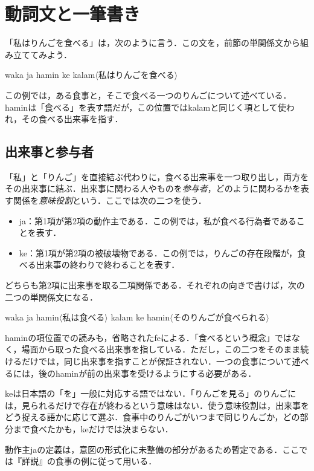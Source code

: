 \documentclass[b5paper, 10pt]{ltjsarticle}
\newcommand{\ko}[1]{\textsf{#1}}
\newcommand{\sentence}[1]{$\langle$#1$\rangle$}
\begin{document}
\section{動詞文と一筆書き}
「私はりんごを食べる」は，次のように言う．この文を，前節の単関係文から組み立ててみよう．
\begin{exe}
    \ex \ko{waka ja hamin ke kalam}\hfill \sentence{私はりんごを食べる}
\end{exe}
この例では，ある食事と，そこで食べる一つのりんごについて述べている．\ko{hamin}は「食べる」を表す語だが，この位置では\ko{kalam}と同じく項として使われ，その食べる出来事を指す．

\subsection{出来事と参与者}
「私」と「りんご」を直接結ぶ代わりに，食べる出来事を一つ取り出し，両方をその出来事に結ぶ．出来事に関わる人やものを\emph{参与者}，どのように関わるかを表す関係を\emph{意味役割}という．ここでは次の二つを使う．
\begin{itemize}
    \item \ko{ja}：第1項が第2項の動作主である．この例では，私が食べる行為者であることを表す．
    \item \ko{ke}：第1項が第2項の被破壊物である．この例では，りんごの存在段階が，食べる出来事の終わりで終わることを表す．
\end{itemize}
どちらも第2項に出来事を取る二項関係である．それぞれの向きで書けば，次の二つの単関係文になる．
\begin{exe}
    \ex \ko{waka ja hamin}\hfill \sentence{私は食べる}
    \ex \ko{kalam ke hamin}\hfill \sentence{そのりんごが食べられる}
\end{exe}
\ko{hamin}の項位置での読みも，省略された\ko{fe}による．「食べるという概念」ではなく，場面から取った食べる出来事を指している．ただし，この二つをそのまま続けるだけでは，同じ出来事を指すことが保証されない．一つの食事について述べるには，後の\ko{hamin}が前の出来事を受けるようにする必要がある．

\begin{remark}
    \ko{ke}は日本語の「を」一般に対応する語ではない．「りんごを見る」のりんごには，見られるだけで存在が終わるという意味はない．使う意味役割は，出来事をどう捉える語かに応じて選ぶ．食事中のりんごがいつまで同じりんごか，どの部分まで食べたかも，\ko{ke}だけでは決まらない．
\end{remark}
\begin{remark}
    動作主\ko{ja}の定義は，意図の形式化に未整備の部分があるため暫定である．ここでは『詳説』の食事の例に従って用いる．
\end{remark}
\end{document}
